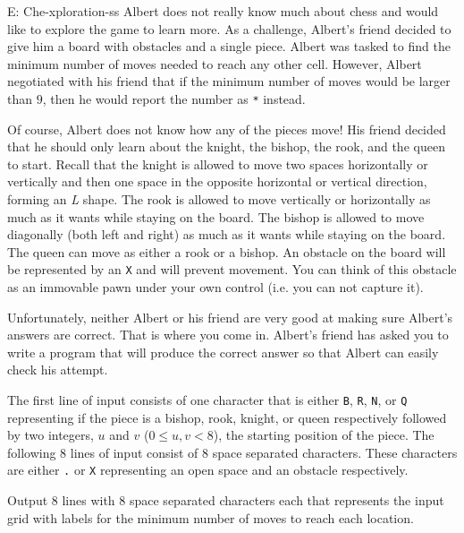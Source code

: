 \begin{problem}{E: Che-xploration-ss}
Albert does not really know much about chess and would like to explore the game to learn more.
As a challenge, Albert's friend decided to give him a board with obstacles and a single piece.
Albert was tasked to find the minimum number of moves needed to reach any other cell.
However, Albert negotiated with his friend that if the minimum number of moves would be larger than $9$, then he would report the number as \texttt{*} instead.

Of course, Albert does not know how any of the pieces move!
His friend decided that he should only learn about the knight, the bishop, the rook, and the queen to start.
Recall that the knight is allowed to move two spaces horizontally or vertically and then one space in the opposite horizontal or vertical direction, forming an \textit{L} shape.
The rook is allowed to move vertically or horizontally as much as it wants while staying on the board.
The bishop is allowed to move diagonally (both left and right) as much as it wants while staying on the board.
The queen can move as either a rook or a bishop.
An obstacle on the board will be represented by an \texttt{X} and will prevent movement.
You can think of this obstacle as an immovable pawn under your own control (i.e. you can not capture it).

Unfortunately, neither Albert or his friend are very good at making sure Albert's answers are correct.
That is where you come in.
Albert's friend has asked you to write a program that will produce the correct answer so that Albert can easily check his attempt.
\end{problem}

\begin{formalin}
The first line of input consists of one character that is either \texttt{B}, \texttt{R}, \texttt{N}, or \texttt{Q} representing if the piece is a bishop, rook, knight, or queen respectively followed by two integers, $u$ and $v$ ($0 \le u, v < 8$), the starting position of the piece.
The following 8 lines of input consist of 8 space separated characters.
These characters are either \texttt{.} or \texttt{X} representing an open space and an obstacle respectively.
\end{formalin}

\begin{formalout}
Output 8 lines with 8 space separated characters each that represents the input grid with labels for the minimum number of moves to reach each location.
\end{formalout}

